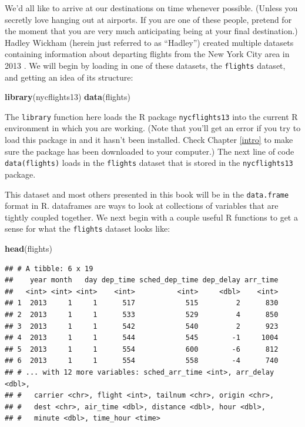 \documentclass[]{tufte-book}
\newenvironment{Shaded}{\begin{snugshade}}{\end{snugshade}}
\newcommand{\KeywordTok}[1]{\textcolor[rgb]{0.13,0.29,0.53}{\textbf{{#1}}}}
\newcommand{\NormalTok}[1]{{#1}}
\begin{document}
We'd all like to arrive at our destinations on time whenever possible.
(Unless you secretly love hanging out at airports. If you are one of
these people, pretend for the moment that you are very much anticipating
being at your final destination.) Hadley Wickham (herein just referred
to as ``Hadley'') created multiple datasets containing information about
departing flights from the New York City area in 2013
\citep{R-nycflights13}. We will begin by loading in one of these
datasets, the \texttt{flights} dataset, and getting an idea of its
structure:

\begin{Shaded}
\begin{Highlighting}[]
\KeywordTok{library}\NormalTok{(nycflights13)}
\KeywordTok{data}\NormalTok{(flights)}
\end{Highlighting}
\end{Shaded}

The \texttt{library} function here loads the R package
\texttt{nycflights13} into the current R environment in which you are
working. (Note that you'll get an error if you try to load this package
in and it hasn't been installed. Check Chapter \ref{intro} to make sure
the package has been downloaded to your computer.) The next line of code
\texttt{data(flights)} loads in the \texttt{flights} dataset that is
stored in the \texttt{nycflights13} package.

This dataset and most others presented in this book will be in the
\texttt{data.frame} format in R. dataframes are ways to look at
collections of variables that are tightly coupled together. We next
begin with a couple useful R functions to get a sense for what the
\texttt{flights} dataset looks like:

\begin{Shaded}
\begin{Highlighting}[]
\KeywordTok{head}\NormalTok{(flights)}
\end{Highlighting}
\end{Shaded}

\begin{verbatim}
## # A tibble: 6 x 19
##    year month   day dep_time sched_dep_time dep_delay arr_time
##   <int> <int> <int>    <int>          <int>     <dbl>    <int>
## 1  2013     1     1      517            515         2      830
## 2  2013     1     1      533            529         4      850
## 3  2013     1     1      542            540         2      923
## 4  2013     1     1      544            545        -1     1004
## 5  2013     1     1      554            600        -6      812
## 6  2013     1     1      554            558        -4      740
## # ... with 12 more variables: sched_arr_time <int>, arr_delay <dbl>,
## #   carrier <chr>, flight <int>, tailnum <chr>, origin <chr>,
## #   dest <chr>, air_time <dbl>, distance <dbl>, hour <dbl>,
## #   minute <dbl>, time_hour <time>
\end{verbatim}
\end{document}
